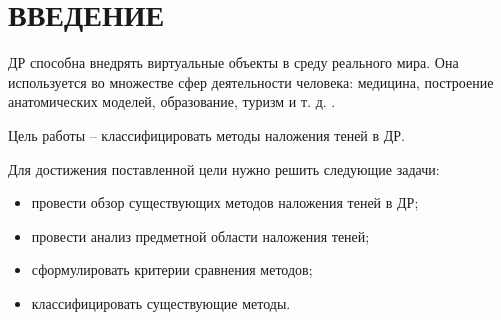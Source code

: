 \chapter*{ВВЕДЕНИЕ}

ДР способна внедрять виртуальные объекты в среду реального мира. Она используется во множестве сфер деятельности человека: медицина, построение анатомических моделей, образование, туризм и т. д. \cite{tech-ar}.


Цель работы -- классифицировать методы наложения теней в ДР.

Для достижения поставленной цели нужно решить следующие задачи:

\begin{itemize}
	\item провести обзор существующих методов наложения теней в ДР;
	\item провести анализ предметной области наложения теней;
	\item сформулировать критерии сравнения методов;
	\item классифицировать существующие методы.
\end{itemize}